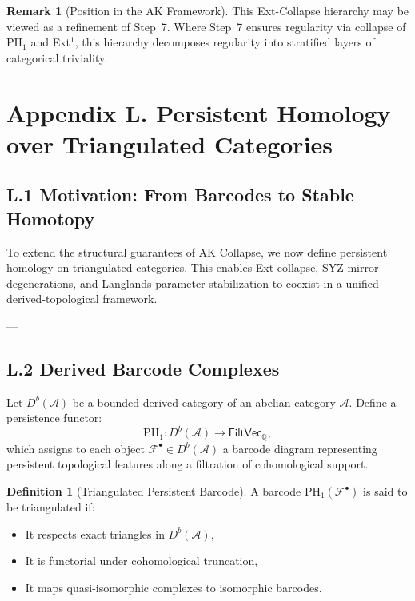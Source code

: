 \documentclass[11pt]{article}
\theoremstyle{definition}
\newtheorem{definition}[theorem]{Definition}
\newtheorem{remark}[theorem]{Remark}
\begin{document}
\begin{remark}[Position in the AK Framework]
This Ext-Collapse hierarchy may be viewed as a refinement of Step~7.  
Where Step~7 ensures regularity via collapse of $\mathrm{PH}_1$ and Ext$^1$,  
this hierarchy decomposes regularity into stratified layers of categorical triviality.
\end{remark}


\section*{Appendix L. Persistent Homology over Triangulated Categories}

\subsection*{L.1 Motivation: From Barcodes to Stable Homotopy}

To extend the structural guarantees of AK Collapse, we now define persistent homology on triangulated categories.  
This enables Ext-collapse, SYZ mirror degenerations, and Langlands parameter stabilization to coexist in a unified derived-topological framework.

---

\subsection*{L.2 Derived Barcode Complexes}

Let \( D^b(\mathcal{A}) \) be a bounded derived category of an abelian category \( \mathcal{A} \).  
Define a persistence functor:
\[
\mathrm{PH}_1: D^b(\mathcal{A}) \longrightarrow \mathsf{FiltVec}_\mathbb{Q},
\]
which assigns to each object \( \mathcal{F}^\bullet \in D^b(\mathcal{A}) \) a barcode diagram representing persistent topological features along a filtration of cohomological support.

\begin{definition}[Triangulated Persistent Barcode]
A barcode \( \mathrm{PH}_1(\mathcal{F}^\bullet) \) is said to be triangulated if:
\begin{itemize}
  \item It respects exact triangles in \( D^b(\mathcal{A}) \),
  \item It is functorial under cohomological truncation,
  \item It maps quasi-isomorphic complexes to isomorphic barcodes.
\end{itemize}
\end{definition}
\end{document}
